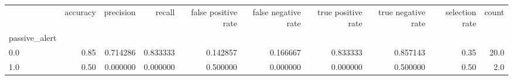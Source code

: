 \begin{tabular}{lrrrrrrrrr}
\toprule
{} &  accuracy &  precision &    recall &  false positive rate &  false negative rate &  true positive rate &  true negative rate &  selection rate &  count \\
passive\_alert &           &            &           &                      &                      &                     &                     &                 &        \\
\midrule
0.0           &      0.85 &   0.714286 &  0.833333 &             0.142857 &             0.166667 &            0.833333 &            0.857143 &            0.35 &   20.0 \\
1.0           &      0.50 &   0.000000 &  0.000000 &             0.500000 &             0.000000 &            0.000000 &            0.500000 &            0.50 &    2.0 \\
\bottomrule
\end{tabular}
